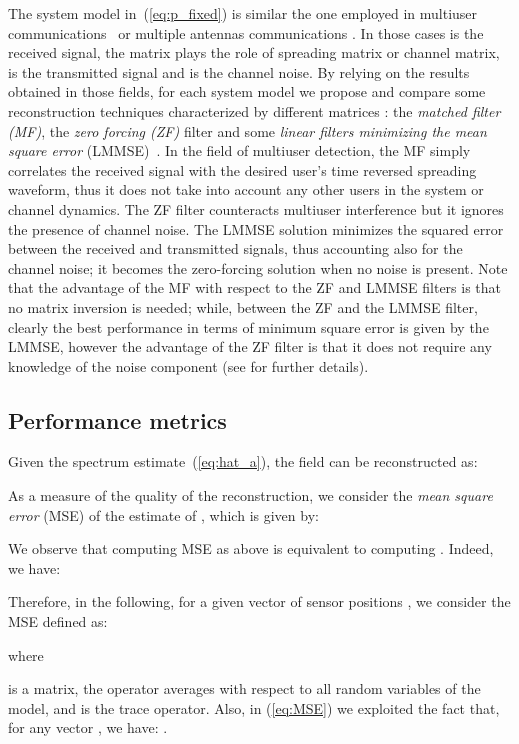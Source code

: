 \documentclass[final, a4paper]{IEEEtran}
\begin{document}
The system model in~(\ref{eq:p_fixed}) is similar
the one employed in multiuser communications~\cite{Verdu_book} or multiple antennas
communications \cite{TulinoVerdu,BigTarTul}.
In those cases  is the received signal, the matrix  plays the role of
spreading matrix or channel matrix,  is the transmitted signal and  is
the channel noise.
By relying on the results obtained in those fields, for each system
model we propose and compare some reconstruction techniques
characterized by different matrices : the {\em matched filter
(MF)}, the {\em zero forcing (ZF)} filter and some {\em linear filters
minimizing the mean square error} (LMMSE)~\cite{Verdu_book}. In the
field of multiuser detection, the MF simply correlates the received
signal with the desired user's time reversed spreading waveform,
thus it does not take into account any other users in the system or
channel dynamics. The ZF filter counteracts multiuser interference
but it ignores the presence of channel noise. The LMMSE solution
minimizes the squared error between the received and transmitted
signals, thus accounting also for the channel noise; it becomes the
zero-forcing solution when no noise is present. Note that the
advantage of the MF with respect to the ZF and LMMSE filters is that
no matrix inversion is needed; while, between the ZF and the LMMSE
filter, clearly the best performance in terms of minimum square
error is given by the LMMSE, however the advantage of the ZF filter
is that it does not require any knowledge of the noise component
(see \cite{Verdu_book} for further details).

\subsection{Performance metrics}
\label{sec:MSE}
Given the spectrum estimate~(\ref{eq:hat_a}), the field can be reconstructed
as:

As a measure of the quality of the reconstruction, we consider
the {\em mean square error} (MSE) of the estimate of , which is given by:

We observe that computing MSE as above is equivalent to computing . 
Indeed, we have:

Therefore, in the following, for a given vector of sensor positions , we consider the MSE defined as:


where

is a  matrix,
the operator  averages with respect to all random variables of the model, and
 is the trace operator.
Also, in (\ref{eq:MSE}) we exploited the fact that, for any vector ,
we have: .
\end{document}
